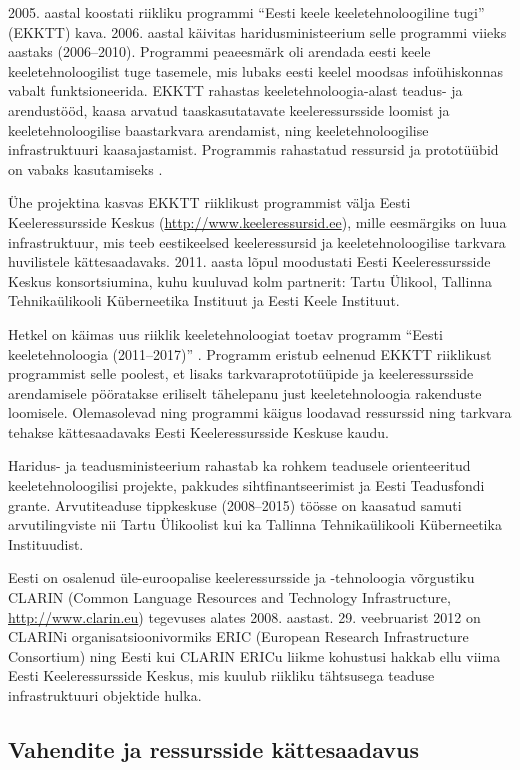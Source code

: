 \begin{multicols}{2}
2005. aastal koostati riikliku programmi ``Eesti keele keeletehnoloogiline tugi'' (EKKTT) kava.  2006. aastal käivitas haridusministeerium selle programmi viieks aastaks (2006--2010).  Programmi peaeesmärk oli arendada eesti keele keeletehnoloogilist tuge tasemele, mis lubaks eesti keelel moodsas infoühiskonnas vabalt funktsioneerida.  EKKTT rahastas keeletehnoloogia-alast teadus- ja arendustööd, kaasa arvatud taaskasutatavate keeleressursside loomist ja keeletehnoloogilise baastarkvara arendamist, ning keeletehnoloogilise infrastruktuuri kaasajastamist.  Programmis rahastatud ressursid ja prototüübid on vabaks kasutamiseks \cite{ekktt}.

Ühe projektina kasvas EKKTT riiklikust programmist välja Eesti Keeleressursside Keskus (\url{http://www.keeleressursid.ee}), mille eesmärgiks on luua infrastruktuur, mis teeb eestikeelsed keeleressursid ja keeletehnoloogilise tarkvara huvilistele kättesaadavaks. 2011. aasta lõpul moodustati Eesti Keeleressursside Keskus konsortsiumina, kuhu kuuluvad kolm partnerit: Tartu Ülikool, Tallinna Tehnikaülikooli Küberneetika Instituut ja Eesti Keele Instituut.

Hetkel on käimas uus riiklik keeletehnoloogiat toetav programm ``Eesti keeletehnoloogia (2011--2017)'' \cite{ekktt2}.  Programm eristub eelnenud EKKTT riiklikust programmist selle poolest, et lisaks tarkvaraprototüüpide ja keeleressursside arendamisele pööratakse eriliselt tähelepanu just keeletehnoloogia rakenduste loomisele. Olemasolevad ning programmi käigus loodavad ressurssid ning tarkvara tehakse kättesaadavaks Eesti Keeleressursside Keskuse kaudu.

Haridus- ja teadusministeerium rahastab ka rohkem teadusele orienteeritud keele\-tehnoloogilisi projekte, pakkudes siht\-finant\-seerimist ja Eesti Teadusfondi grante.  Arvutiteaduse tippkeskuse (2008--2015) töösse on kaasatud samuti arvutilingviste nii Tartu Ülikoolist kui ka Tallinna Tehnika\-ülikooli Küberneetika Instituudist.

Eesti on osalenud üle-euroopalise keeleressursside ja -tehnoloogia võrgustiku CLARIN (Common Language Resources and Technology Infrastructure, \url{http://www.clarin.eu}) tegevuses alates 2008. aastast. 29. veebruarist 2012 on CLARINi organisatsioonivormiks ERIC (European Research Infrastructure Consortium) ning Eesti kui CLARIN ERICu liikme kohustusi hakkab ellu viima Eesti Keeleressursside Keskus, mis kuulub riikliku tähtsusega teaduse infrastruktuuri objektide hulka.

\subsection{Vahendite ja ressursside kättesaadavus}


\end{multicols}
